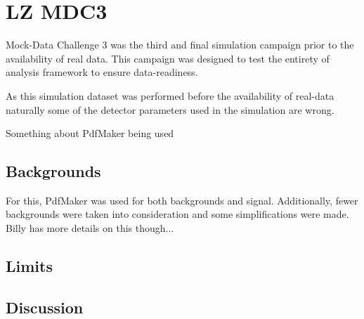 \section{LZ MDC3}
\par
Mock-Data Challenge 3 was the third and final simulation campaign prior to the availability of real data.
This campaign was designed to test the entirety of analysis framework to ensure data-readiness.

\par
As this simulation dataset was performed before the availability of real-data naturally some of the detector parameters used in the simulation are wrong.

\par
Something about PdfMaker being used

\subsection{Backgrounds}
\par
For this, PdfMaker was used for both backgrounds and signal.
Additionally, fewer backgrounds were taken into consideration and some simplifications were made.
Billy has more details on this though...

\subsection{Limits}
\par


\subsection{Discussion}